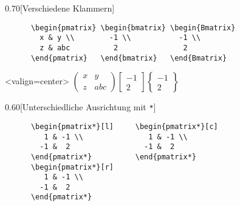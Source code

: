 \begin{frame}[fragile]
  \fontsize{8}{0.8\baselineskip}\selectfont
  \begin{CodeExample}{0.70}[Verschiedene Klammern]
    \begin{lstlisting}
      \begin{pmatrix} \begin{bmatrix} \begin{Bmatrix}
        x & y \\        -1 \\           -1 \\
        z & abc          2               2
      \end{pmatrix}   \end{bmatrix}   \end{Bmatrix}
    \end{lstlisting}
  \CodeResult<valign=center>
    $\displaystyle
      \begin{pmatrix}
        x & y \\
        z & abc
      \end{pmatrix}
      \begin{bmatrix}
        -1 \\
         2
      \end{bmatrix}
      \begin{Bmatrix}
        -1 \\
         2
      \end{Bmatrix}
    $
  \end{CodeExample}
  \begin{CodeExample}{0.60}[Unterschiedliche Ausrichtung mit \lstinline+*+]
    \begin{lstlisting}
      \begin{pmatrix*}[l]     \begin{pmatrix*}[c]
         1 & -1 \\               1 & -1 \\
        -1 &  2                 -1 &  2
      \end{pmatrix*}          \end{pmatrix*}
      \begin{pmatrix*}[r]
         1 & -1 \\
        -1 &  2
      \end{pmatrix*}
    \end{lstlisting}
  \CodeResult
\end{CodeExample}
\end{frame}
